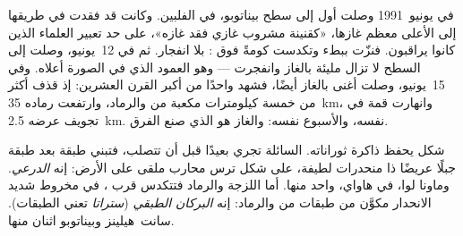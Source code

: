 \begin{example}\label{ex:g7:volcanoes:pinatubo}
في يونيو~1991 وصلت أول  إلى سطح  بيناتوبو، في
الفلبين. وكانت قد فقدت في طريقها إلى الأعلى معظم غازها، «كقنينة
مشروب غازي فقد غازه»، على حد تعبير العلماء الذين كانوا يراقبون.
فنزّت ببطء وتكدست كومةً فوق : بلا انفجار.
ثم في 12~يونيو، وصلت إلى السطح  لا تزال مليئة بالغاز
وانفجرت --- وهو العمود الذي في الصورة أعلاه. وفي 15~يونيو، وصلت  أغنى
بالغاز أيضًا، فشهد  واحدًا من أكبر 
القرن العشرين: إذ قذف أكثر من خمسة كيلومترات مكعبة من
 والرماد، وارتفعت  رماده \qty{35}{km}، وانهارت قمة
 في تجويف عرضه \qty{2.5}{km}.  نفسه،
والأسبوع نفسه: والغاز هو الذي صنع الفرق.
\end{example}

شكل  يحفظ ذاكرة ثوراناته.  السائلة تجري
بعيدًا قبل أن تتصلب، فتبني طبقة بعد طبقة جبلًا عريضًا ذا
منحدرات لطيفة، على شكل ترس محارب ملقى على الأرض: إنه
\emph{ الدرعي}. وماونا لوا، في هاواي، واحد منها. أما  اللزجة والرماد فتتكدس
قرب ، في مخروط شديد الانحدار مكوَّن من طبقات من 
والرماد: إنه \emph{البركان الطبقي} (\emph{ستراتا} تعني الطبقات).  سانت~هيلينز
وبيناتوبو اثنان منها.

